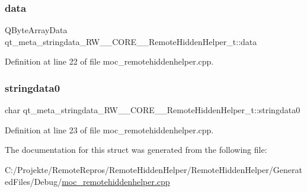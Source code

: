 \subsubsection{\texorpdfstring{data}{data}}
{\footnotesize\ttfamily Q\+Byte\+Array\+Data qt\+\_\+meta\+\_\+stringdata\+\_\+\+R\+W\+\_\+\+\_\+\+C\+O\+R\+E\+\_\+\+\_\+\+Remote\+Hidden\+Helper\+\_\+t\+::data}



Definition at line 22 of file moc\+\_\+remotehiddenhelper.\+cpp.

\hypertarget{structqt__meta__stringdata___r_w_____c_o_r_e_____remote_hidden_helper__t_aff520200e964f9c40cd2d329d5b95a97}{}\label{structqt__meta__stringdata___r_w_____c_o_r_e_____remote_hidden_helper__t_aff520200e964f9c40cd2d329d5b95a97} 
\subsubsection{\texorpdfstring{stringdata0}{stringdata0}}
{\footnotesize\ttfamily char qt\+\_\+meta\+\_\+stringdata\+\_\+\+R\+W\+\_\+\+\_\+\+C\+O\+R\+E\+\_\+\+\_\+\+Remote\+Hidden\+Helper\+\_\+t\+::stringdata0}



Definition at line 23 of file moc\+\_\+remotehiddenhelper.\+cpp.



The documentation for this struct was generated from the following file\+:\begin{DoxyCompactItemize}
\item 
C\+:/\+Projekte/\+Remote\+Repros/\+Remote\+Hidden\+Helper/\+Remote\+Hidden\+Helper/\+Generated\+Files/\+Debug/\hyperlink{_debug_2moc__remotehiddenhelper_8cpp}{moc\+\_\+remotehiddenhelper.\+cpp}\end{DoxyCompactItemize}

